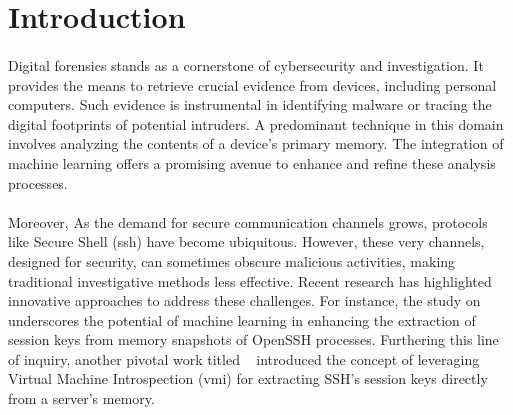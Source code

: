 \section{Introduction}\label{chap:introduction}

\begin{comment}
Motivate your research and outline the research gap in this chapter. Why is your thesis relevant and what do you address, what has not been addressed before. 

General Requirements to the thesis:

\begin{itemize}
	\item 60 pages of content in this format. Content does not include table of content, lists, appendices etc.
	\item Proper scientific referencing
	\item Introduction and Background should be less than 50\% of the thesis
	\item Images should be readable and in the proper size. 
\end{itemize}
\end{comment}

\paragraph*{}Digital forensics stands as a cornerstone of cybersecurity and investigation. It provides the means to retrieve crucial evidence from devices, including personal computers. Such evidence is instrumental in identifying malware or tracing the digital footprints of potential intruders. A predominant technique in this domain involves analyzing the contents of a device's primary memory. The integration of machine learning offers a promising avenue to enhance and refine these analysis processes.
\paragraph*{}Moreover, As the demand for secure communication channels grows, protocols like Secure Shell (\acrshort{ssh}) have become ubiquitous. However, these very channels, designed for security, can sometimes obscure malicious activities, making traditional investigative methods less effective. Recent research has highlighted innovative approaches to address these challenges. For instance, the study on ~\cite*{fellicious_smartkex_2022} underscores the potential of machine learning in enhancing the extraction of session keys from memory snapshots of OpenSSH processes. Furthering this line of inquiry, another pivotal work titled ~\cite*{sentanoe_sshkex_2022} introduced the concept of leveraging Virtual Machine Introspection (\acrshort{vmi}) for extracting SSH's session keys directly from a server's memory. 

